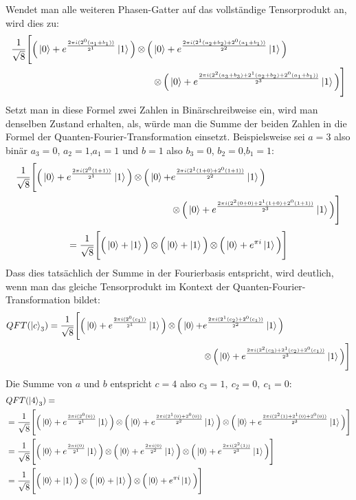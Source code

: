 Wendet man alle weiteren Phasen-Gatter auf das vollständige Tensorprodukt an, 
wird dies zu:
\begin{align*}
    \frac{1}{\sqrt{8}} 
    \Bigg[ 
      \Big(\ket{0} + { e^{\frac{2 \pi i (2^0(a_1+b_1))}{2^1}}}\ket{1} \Big) 
      \operatorname{\otimes}
      \Big( &\ket{0} + { e^{\frac{2 \pi i (2^1(a_2+b_2)+2^0(a_1+b_1))}{2^2}}}\ket{1} \Big)\\ 
      &\operatorname{\otimes}
      \Big( \ket{0} + { e^{\frac{2 \pi i (2^{2}(a_3+b_3) +2^1(a_2+b_2)+2^0(a_1+b_1))}{2^3}}}\ket{1} \Big) 
    \Bigg]
\end{align*}
Setzt man in diese Formel zwei Zahlen in Binärschreibweise ein, 
wird man denselben Zustand erhalten,
als, würde man die Summe der beiden Zahlen in die Formel der Quanten-Fourier-Transformation einsetzt.
Beispielsweise sei \(a = 3\) also binär \(a_3 = 0\), \(a_2 = 1\),\(a_1 = 1\) und 
\(b = 1\) also \(b_3 = 0\), \(b_2 = 0\),\(b_1 = 1\):
\begin{align*}
\frac{1}{\sqrt{8}} 
\Bigg[ \Big(\ket{0} + { e^{\frac{2 \pi i (2^0(1+1))}{2^1}}}\ket{1} \Big) 
\operatorname{\otimes}
\Big( \ket{0} + &{ e^{\frac{2 \pi i (2^1(1+0)+2^0(1+1))}{2^2}}}\ket{1} \Big) \\
&\operatorname{\otimes}
\Big( \ket{0} + { e^{\frac{2 \pi i (2^{2}(0+0) +2^1(1+0)+2^0(1+1))}{2^3}}}\ket{1} \Big) 
\Bigg]
\end{align*}
\[
=\frac{1}{\sqrt{8}} 
\Bigg[ \Big(\ket{0} + \ket{1} \Big) \operatorname{\otimes}
\Big( \ket{0} +   \ket{1} \Big) \operatorname{\otimes}
\Big( \ket{0} +  e^{\pi i }\ket{1} \Big) 
\Bigg]
\]
Dass dies tatsächlich der Summe in der Fourierbasis entspricht, wird deutlich, 
wenn man das gleiche Tensorprodukt im Kontext der Quanten-Fourier-Transformation bildet:
\begin{align*}
    QFT(\ket{c}_3) = 
    \frac{1}{\sqrt{8}} 
    \Bigg[ \Big(\ket{0} + { e^{\frac{2 \pi i (2^0(c_1))}{2^1}}}\ket{1} \Big) 
    \operatorname{\otimes}
    \Big( \ket{0} + &{ e^{\frac{2 \pi i (2^1(c_2)+2^0(c_1))}{2^2}}}\ket{1} \Big) \\
    &\operatorname{\otimes}
    \Big( \ket{0} + { e^{\frac{2 \pi i (2^{2}(c_3) +2^1(c_2)+2^0(c_1))}{2^3}}}\ket{1} \Big) 
\Bigg]
\end{align*}
Die Summe von \(a\) und \(b\) entspricht \(c = 4\) also \(c_3 = 1,~c_2 = 0,~c_1=0\):
\begin{align*}
    &QFT(\ket{4}_3) = \\
    &= \frac{1}{\sqrt{8}} \Bigg[ \Big(\ket{0} + { e^{\frac{2 \pi i (2^0(0))}{2^1}}}\ket{1} \Big) 
    \operatorname{\otimes}
    \Big( \ket{0} + { e^{\frac{2 \pi i (2^1(0)+2^0(0))}{2^2}}}\ket{1} \Big) 
\operatorname{\otimes}
\Big( \ket{0} + { e^{\frac{2 \pi i (2^{2}(1) +2^1(0)+2^0(0))}{2^3}}}\ket{1} \Big) \Bigg] \\
    &= 
    \frac{1}{\sqrt{8}} \Bigg[ \Big(\ket{0} + { e^{\frac{2 \pi i (0)}{2^1}}}\ket{1} \Big) 
    \operatorname{\otimes}
    \Big( \ket{0} + { e^{\frac{2 \pi i (0)}{2^2}}}\ket{1} \Big) 
\operatorname{\otimes}
\Big( \ket{0} + { e^{\frac{2 \pi i (2^{2}(1))}{2^3}}}\ket{1} \Big) \Bigg] \\
&=\frac{1}{\sqrt{8}} \Bigg[ \Big(\ket{0} + \ket{1} \Big) 
\operatorname{\otimes}
\Big( \ket{0} +   \ket{1} \Big) 
\operatorname{\otimes}
\Big( \ket{0} +  e^{\pi i }\ket{1} \Big) \Bigg]
\end{align*}
